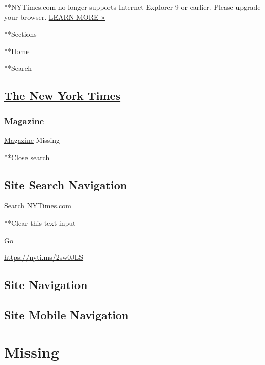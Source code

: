  **NYTimes.com no longer supports Internet Explorer 9 or earlier. Please
upgrade your browser.
\href{http://www.nytimes3xbfgragh.onion/content/help/site/ie9-support.html}{LEARN
MORE »}

**Sections

**Home

**Search

\hypertarget{the-new-york-times}{%
\subsection{\texorpdfstring{\href{http://www.nytimes3xbfgragh.onion/}{The
New York Times}}{The New York Times}}\label{the-new-york-times}}

\hypertarget{-magazine-}{%
\subsubsection{\texorpdfstring{
\href{https://www.nytimes3xbfgragh.onion/section/magazine}{Magazine}
}{ Magazine }}\label{-magazine-}}

 \href{https://www.nytimes3xbfgragh.onion/section/magazine}{Magazine}
\textbar{}Missing

**Close search

\hypertarget{site-search-navigation}{%
\subsection{Site Search Navigation}\label{site-search-navigation}}

Search NYTimes.com

**Clear this text input

Go

\url{https://nyti.ms/2sw0JLS}

\hypertarget{site-navigation}{%
\subsection{Site Navigation}\label{site-navigation}}

\hypertarget{site-mobile-navigation}{%
\subsection{Site Mobile Navigation}\label{site-mobile-navigation}}

\hypertarget{missing}{%
\section{Missing}\label{missing}}


